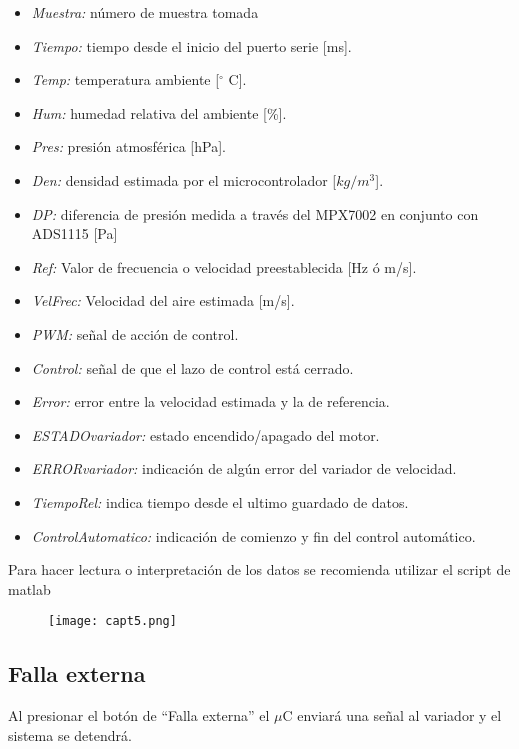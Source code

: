 \begin{itemize}
	\item \textit{Muestra:} número de muestra tomada
	\item \textit{Tiempo:} tiempo desde el inicio del puerto serie [ms].
	\item \textit{Temp:} temperatura ambiente [$^{\circ}$ C].
	\item \textit{Hum:} humedad relativa del ambiente [\%].
	\item \textit{Pres:} presión atmosférica [hPa].
	\item \textit{Den:} densidad estimada por el microcontrolador [$kg/m^3$].
	\item \textit{DP:} diferencia de presión medida a través del MPX7002 en conjunto con ADS1115 [Pa]
	\item \textit{Ref:} Valor de frecuencia o velocidad preestablecida [Hz ó m/s].
	\item \textit{VelFrec:} Velocidad del aire estimada [m/s].
	\item \textit{PWM:} señal de acción de control.
	\item \textit{Control:} señal de que el lazo de control está cerrado.
	\item \textit{Error:} error entre la velocidad estimada y la de referencia.
	\item \textit{ESTADOvariador:} estado encendido/apagado del motor.
	\item \textit{ERRORvariador:} indicación de algún error del variador de velocidad.
	\item \textit{TiempoRel:} indica tiempo desde el ultimo guardado de datos.
	\item \textit{ControlAutomatico:} indicación de comienzo y fin del control automático.
		
\end{itemize}

Para hacer lectura o interpretación de los datos se recomienda utilizar el script de matlab 

\begin{figure}[H]
	\centering
	\texttt{[image: capt5.png]}
	\label{fig:capt5}
\end{figure}

\subsection{Falla externa}
	Al presionar el botón de “Falla externa” el $\mu$C enviará una señal al variador y el sistema se detendrá.

